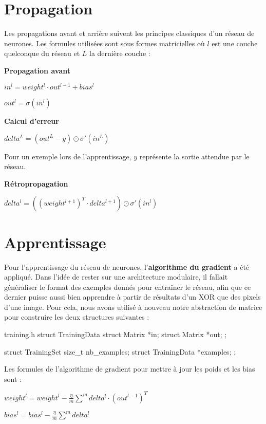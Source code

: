 \section{Propagation}

Les propagations avant et arrière suivent les principes classiques d'un réseau
de neurones. Les formules utilisées sont sous formes matricielles où $l$ est une
couche quelconque du réseau et $L$ la dernière couche :

\textbf{Propagation avant}

$in^l = weight^l \cdot out^{l-1} + bias^l$

$out^l = \sigma (in^l)$

\newpage

\textbf{Calcul d'erreur}

$delta^L = (out^L − y) \odot \sigma '(in^L)$

Pour un exemple lors de l'apprentissage, $y$ représente la sortie attendue par
le réseau.

\textbf{Rétropropagation}

$delta^l = ((weight^{l+1})^T \cdot delta^{l+1}) \odot \sigma '(in^l)$

\section{Apprentissage}

Pour l'apprentissage du réseau de neurones, l'\textbf{algorithme du gradient} a
été appliqué. Dans l'idée de rester sur une architecture modulaire, il fallait
généraliser le format des exemples donnés pour entraîner le réseau, afin que ce
dernier puisse aussi bien apprendre à partir de résultats d'un XOR que des
pixels d'une image. Pour cela, nous avons utilisé à nouveau notre abstraction de
matrice pour construire les deux structures suivantes :

\begin{myminted}{training.h}
struct TrainingData
{
    struct Matrix *in;
    struct Matrix *out;
};

struct TrainingSet
{
    size_t nb_examples;
    struct TrainingData *examples;
};
\end{myminted}

\newpage

Les formules de l'algorithme de gradient pour mettre à jour les poids et les
bias sont :

$weight^l = weight^l - \frac{\eta}{m} \displaystyle\sum^m{delta^l \cdot (out^{l-1})^T}$

$bias^l = bias^l - \frac{\eta}{m} \displaystyle\sum^m{delta^l}$

